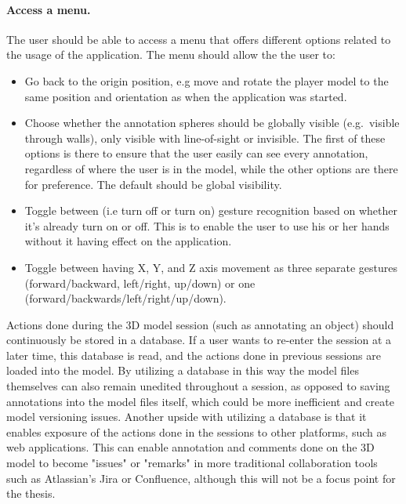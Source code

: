 \paragraph{Access a menu.} The user should be able to access a menu that offers different options related to the usage of the application.
The menu should allow the the user to:
\begin{itemize}
	\item Go back to the origin position, e.g move and rotate the player model to the same position and orientation as when the application was started.
	\item Choose whether the annotation spheres should be globally visible (e.g.~visible through walls), only visible with line-of-sight or invisible.
		  The first of these options is there to ensure that the user easily can see every annotation, regardless of where the user is in the model,
		  while the other options are there for preference. The default should be global visibility.
	\item Toggle between (i.e turn off or turn on) gesture recognition based on whether it's already turn on or off.
		  This is to enable the user to use his or her hands without it having effect on the application. 
	\item Toggle between having X, Y, and Z axis movement as three separate gestures (forward/backward, left/right, up/down) or one (forward/backwards/left/right/up/down). 
\end{itemize}


Actions done during the 3D model session (such as annotating an object) should continuously be stored in a database. 
If a user wants to re-enter the session at a later time, this database is read, and the actions done in previous sessions are loaded into the model.
By utilizing a database 
in this way the model files themselves can also remain unedited throughout a session, as opposed to saving annotations into the model files itself, 
which could be more inefficient and create model versioning issues. 
Another upside with utilizing a database is that it enables exposure of the actions done in the sessions to other platforms, such as web applications. 
This can enable annotation and comments done on the 3D model to become "issues" or "remarks" in more traditional collaboration tools such as Atlassian's Jira or Confluence, 
although this will not be a focus point for the thesis.  


